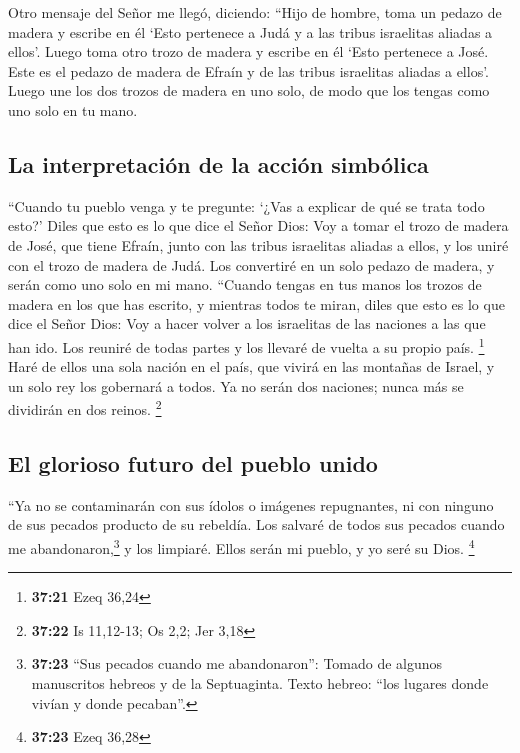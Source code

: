  Otro mensaje del Señor me llegó, diciendo:
 ``Hijo de hombre, toma un pedazo de madera y escribe en
él `Esto pertenece a Judá y a las tribus israelitas aliadas a ellos'.
Luego toma otro trozo de madera y escribe en él `Esto pertenece a José.
Este es el pedazo de madera de Efraín y de las tribus israelitas aliadas
a ellos'.  Luego une los dos trozos de madera en uno
solo, de modo que los tengas como uno solo en tu mano.

\hypertarget{la-interpretaciuxf3n-de-la-acciuxf3n-simbuxf3lica}{%
\subsection{La interpretación de la acción
simbólica}\label{la-interpretaciuxf3n-de-la-acciuxf3n-simbuxf3lica}}

 ``Cuando tu pueblo venga y te pregunte: `¿Vas a explicar
de qué se trata todo esto?'  Diles que esto es lo que
dice el Señor Dios: Voy a tomar el trozo de madera de José, que tiene
Efraín, junto con las tribus israelitas aliadas a ellos, y los uniré con
el trozo de madera de Judá. Los convertiré en un solo pedazo de madera,
y serán como uno solo en mi mano.  ``Cuando tengas en tus
manos los trozos de madera en los que has escrito, y mientras todos te
miran,  diles que esto es lo que dice el Señor Dios: Voy
a hacer volver a los israelitas de las naciones a las que han ido. Los
reuniré de todas partes y los llevaré de vuelta a su propio país.
\footnote{\textbf{37:21} Ezeq 36,24}  Haré de ellos una
sola nación en el país, que vivirá en las montañas de Israel, y un solo
rey los gobernará a todos. Ya no serán dos naciones; nunca más se
dividirán en dos reinos. \footnote{\textbf{37:22} Is 11,12-13; Os 2,2;
  Jer 3,18}

\hypertarget{el-glorioso-futuro-del-pueblo-unido}{%
\subsection{El glorioso futuro del pueblo
unido}\label{el-glorioso-futuro-del-pueblo-unido}}

 ``Ya no se contaminarán con sus ídolos o imágenes
repugnantes, ni con ninguno de sus pecados producto de su rebeldía. Los
salvaré de todos sus pecados cuando me abandonaron,\footnote{\textbf{37:23}
  ``Sus pecados cuando me abandonaron'': Tomado de algunos manuscritos
  hebreos y de la Septuaginta. Texto hebreo: ``los lugares donde vivían
  y donde pecaban''.} y los limpiaré. Ellos serán mi pueblo, y yo seré
su Dios. \footnote{\textbf{37:23} Ezeq 36,28}


